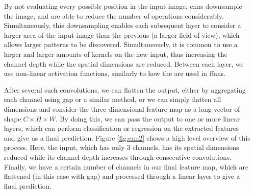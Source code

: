 \documentclass[UKenglish]{uiomasterthesis} %
\theoremstyle{definition}
\begin{document}
By not evaluating every possible position in the input image, \acp{cnn} downsample the image, and are able to reduce the number of operations considerably. Simultaneously, this downsampling enables each subsequent layer to consider a larger area of the input image than the previous (a larger field-of-view), which allows larger patterns to be discovered. Simultaneously, it is common to use a larger and larger amounts of kernels on the new input, thus increasing the channel depth while the spatial dimensions are reduced. Between each layer, we use non-linear activation functions, similarly to how the are used in \acp{ffnn}.

After several such convolutions, we can flatten the output, either by aggregating each channel using \ac{gap} or a similar method, or we can simply flatten all dimensions and consider the three dimensional feature map as a long vector of shape $C \times H \times W$. By doing this, we can pass the output to one or more linear layers, which can perform classification or regression on the extracted features and give us a final prediction. Figure \ref{fig:cnn2} shows a high level overview of this process. Here, the input, which has only 3 channels, has its spatial dimensions reduced while its channel depth increases through consecutive convolutions. Finally, we have a certain number of channels in our final feature map, which are flattened (in this case with \ac{gap}) and processed through a linear layer to give a final prediction.
\end{document}
